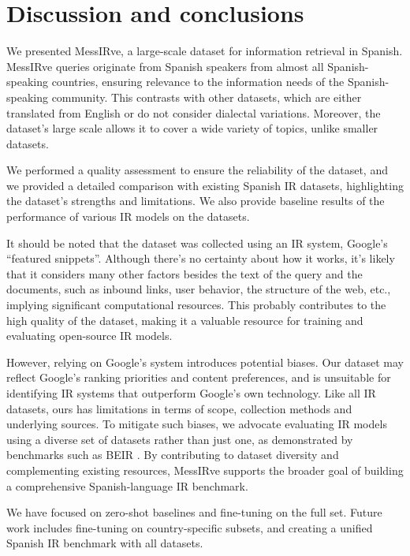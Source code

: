 \documentclass[11pt]{article}
\begin{document}
\section{Discussion and conclusions} \label{sec:conclusions}

We presented MessIRve, a large-scale dataset for information retrieval in Spanish. MessIRve queries originate from Spanish speakers from almost all Spanish-speaking countries, ensuring relevance to the information needs of the Spanish-speaking community. This contrasts with other datasets, which are either translated from English or do not consider dialectal variations. Moreover, the dataset's large scale allows it to cover a wide variety of topics, unlike smaller datasets.

We performed a quality assessment to ensure the reliability of the dataset, and we provided a detailed comparison with existing Spanish IR datasets, highlighting the dataset's strengths and limitations. We also provide baseline results of the performance of various IR models on the datasets.

It should be noted that the dataset was collected using an IR system, Google's ``featured snippets''. Although there's no certainty about how it works, it's likely that it considers many other factors besides the text of the query and the documents, such as inbound links, user behavior, the structure of the web, etc., implying significant computational resources. This probably contributes to the high quality of the dataset, making it a valuable resource for training and evaluating open-source IR models. 

However, relying on Google's system introduces potential biases.
Our dataset may reflect Google's ranking priorities and content preferences, and is unsuitable for identifying IR systems that outperform Google's own technology.
Like all IR datasets, ours has limitations in terms of scope, collection methods and underlying sources.
To mitigate such biases, we advocate evaluating IR models using a diverse set of datasets rather than just one, as demonstrated by benchmarks such as BEIR \citep{thakur2021beir}.
By contributing to dataset diversity and complementing existing resources, MessIRve supports the broader goal of building a comprehensive Spanish-language IR benchmark. 

We have focused on zero-shot baselines and fine-tuning on the full set. Future work includes fine-tuning on country-specific subsets, and creating a unified Spanish IR benchmark with all datasets.
\end{document}
